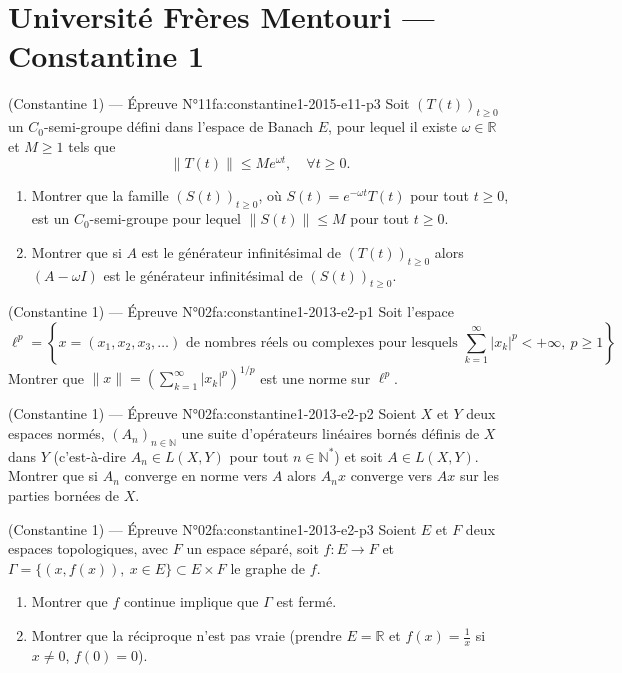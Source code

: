 \section{Université Frères Mentouri --- Constantine 1}
\begin{problem}{(Constantine 1) — Épreuve N°11}{fa:constantine1-2015-e11-p3}
Soit $(T(t))_{t\ge0}$ un $C_0$-semi-groupe défini dans l'espace de Banach $E$, pour lequel il existe $\omega\in\mathbb{R}$ et $M\ge1$ tels que
$$\|T(t)\|\le Me^{\omega t},\quad\forall t\ge0.$$
\begin{enumerate}\item Montrer que la famille $(S(t))_{t\ge0}$, où $S(t)=e^{-\omega t}T(t)$ pour tout $t\ge0$, est un $C_0$-semi-groupe pour lequel $\|S(t)\|\le M$ pour tout $t\ge0$.\item Montrer que si $A$ est le générateur infinitésimal de $(T(t))_{t\ge0}$ alors $(A-\omega I)$ est le générateur infinitésimal de $(S(t))_{t\ge0}$.\end{enumerate}
\end{problem}
\newpage
\begin{problem}{(Constantine 1) — Épreuve N°02}{fa:constantine1-2013-e2-p1}
Soit l'espace
$$\ell^p=\left\{x=(x_1,x_2,x_3,\ldots)\text{ de nombres réels ou complexes pour lesquels }\sum_{k=1}^\infty|x_k|^p<+\infty,\ p\ge1\right\}.$$
Montrer que $\|x\|=\left(\sum_{k=1}^\infty|x_k|^p\right)^{1/p}$ est une norme sur $\ell^p$.
\end{problem}
\newpage
\begin{problem}{(Constantine 1) — Épreuve N°02}{fa:constantine1-2013-e2-p2}
Soient $X$ et $Y$ deux espaces normés, $(A_n)_{n\in\mathbb{N}}$ une suite d'opérateurs linéaires bornés définis de $X$ dans $Y$ (c'est-à-dire $A_n\in L(X,Y)$ pour tout $n\in\mathbb{N}^*$) et soit $A\in L(X,Y)$. Montrer que si $A_n$ converge en norme vers $A$ alors $A_nx$ converge vers $Ax$ sur les parties bornées de $X$.
\end{problem}
\newpage
\begin{problem}{(Constantine 1) — Épreuve N°02}{fa:constantine1-2013-e2-p3}
Soient $E$ et $F$ deux espaces topologiques, avec $F$ un espace séparé, soit $f:E\to F$ et $\Gamma=\{(x,f(x)),\ x\in E\}\subset E\times F$ le graphe de $f$.
\begin{enumerate}\item Montrer que $f$ continue implique que $\Gamma$ est fermé.\item Montrer que la réciproque n'est pas vraie (prendre $E=\mathbb{R}$ et $f(x)=\frac{1}{x}$ si $x\neq0$, $f(0)=0$).\end{enumerate}
\end{problem}

